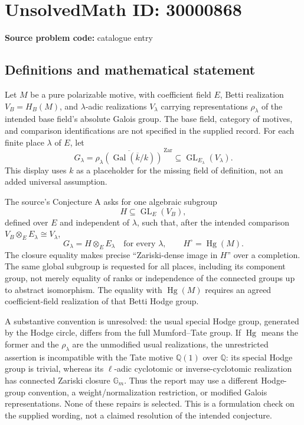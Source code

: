 \documentclass[11pt]{article}
\newcommand{\Q}{\mathbb{Q}}
\begin{document}
\section*{UnsolvedMath ID: 30000868}
\textbf{Source problem code:} catalogue entry
\subsection{Definitions and mathematical statement}
Let \(M\) be a pure polarizable motive, with coefficient field \(E\), Betti realization \(V_B=H_B(M)\), and \(\lambda\)-adic realizations \(V_\lambda\) carrying representations \(\rho_\lambda\) of the intended base field's absolute Galois group. The base field, category of motives, and comparison identifications are not specified in the supplied record. For each finite place \(\lambda\) of \(E\), let
\[
 G_\lambda=\overline{\rho_\lambda(\operatorname{Gal}(\overline k/k))}^{\,\mathrm{Zar}}
 \subseteq\operatorname{GL}_{E_\lambda}(V_\lambda).
\]
This display uses \(k\) as a placeholder for the missing field of definition, not an added universal assumption.

The source's Conjecture A asks for one algebraic subgroup
\[
 H\subseteq\operatorname{GL}_E(V_B),
\]
defined over \(E\) and independent of \(\lambda\), such that, after the intended comparison \(V_B\otimes_E E_\lambda\cong V_\lambda\),
\[
 G_\lambda=H\otimes_E E_\lambda\quad\text{for every }\lambda,
 \qquad H^\circ=\operatorname{Hg}(M).
\]
The closure equality makes precise ``Zariski-dense image in \(H\)'' over a completion. The same global subgroup is requested for all places, including its component group, not merely equality of ranks or independence of the connected groups up to abstract isomorphism. The equality with \(\operatorname{Hg}(M)\) requires an agreed coefficient-field realization of that Betti Hodge group.

A substantive convention is unresolved: the usual special Hodge group, generated by the Hodge circle, differs from the full Mumford--Tate group. If \(\operatorname{Hg}\) means the former and the \(\rho_\lambda\) are the unmodified usual realizations, the unrestricted assertion is incompatible with the Tate motive \(\Q(1)\) over \(\Q\): its special Hodge group is trivial, whereas its \(\ell\)-adic cyclotomic or inverse-cyclotomic realization has connected Zariski closure \(\mathbb G_m\). Thus the report may use a different Hodge-group convention, a weight/normalization restriction, or modified Galois representations. None of these repairs is selected. This is a formulation check on the supplied wording, not a claimed resolution of the intended conjecture.
\end{document}
